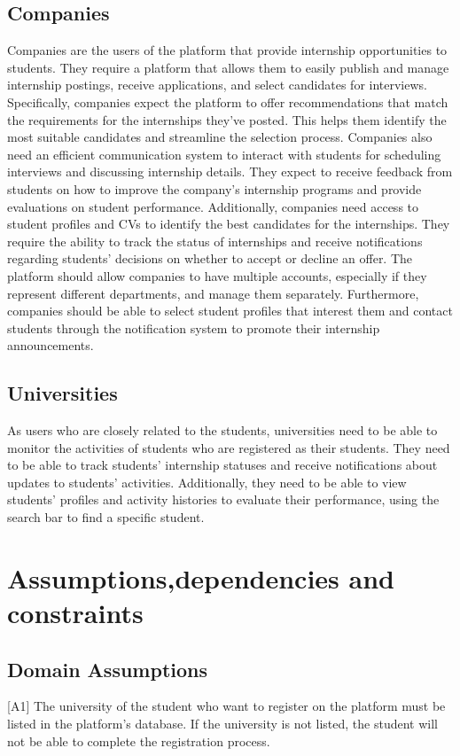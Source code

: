 \subsection{Companies}
Companies are the users of the platform that provide internship opportunities to students. They require a platform that allows them to easily publish and 
manage internship postings, receive applications, and select candidates for interviews. Specifically, companies expect the platform to offer recommendations 
that match the requirements for the internships they’ve posted. This helps them identify the most suitable candidates and streamline the selection process.
Companies also need an efficient communication system to interact with students for scheduling interviews and discussing internship details. 
They expect to receive feedback from students on how to improve the company’s internship programs and provide evaluations on student performance.
Additionally, companies need access to student profiles and CVs to identify the best candidates for the internships. 
They require the ability to track the status of internships and receive notifications regarding students' decisions on whether to accept or decline an offer.
The platform should allow companies to have multiple accounts, especially if they represent different departments, and manage them separately. 
Furthermore, companies should be able to select student profiles that interest them and contact students through the notification system to promote their 
internship announcements.

\subsection{Universities}
As users who are closely related to the students, universities need to be able to monitor the activities of students who are registered as their students.
They need to be able to track students' internship statuses and receive notifications about updates to students' activities. Additionally, they need to 
be able to view students' profiles and activity histories to evaluate their performance, using the search bar to find a specific student.

\section{Assumptions,dependencies and constraints}\label{subsec:assumptions_dependencies_constraints}
\subsection{Domain Assumptions}
[A1] The university of the student who want to register on the platform must be listed in the platform's database. If the university is not listed, the student
will not be able to complete the registration process.

